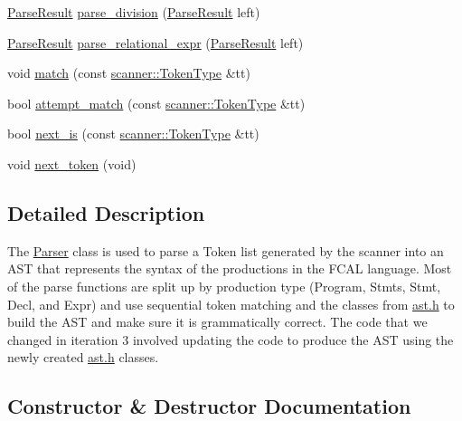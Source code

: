 \begin{DoxyCompactItemize}
\item 
\hyperlink{classfcal_1_1parser_1_1ParseResult}{Parse\+Result} \hyperlink{classfcal_1_1parser_1_1Parser_a244da88d6e0fffb16df81a2d63599d12}{parse\+\_\+division} (\hyperlink{classfcal_1_1parser_1_1ParseResult}{Parse\+Result} left)
\item 
\hyperlink{classfcal_1_1parser_1_1ParseResult}{Parse\+Result} \hyperlink{classfcal_1_1parser_1_1Parser_a6de383f3ce806fdeb0a627b323cadc82}{parse\+\_\+relational\+\_\+expr} (\hyperlink{classfcal_1_1parser_1_1ParseResult}{Parse\+Result} left)
\item 
void \hyperlink{classfcal_1_1parser_1_1Parser_a83087c1451996a4446a945e230a5a34c}{match} (const \hyperlink{namespacefcal_1_1scanner_ad95bd8241e3350b2d765f6b929eb0d93}{scanner\+::\+Token\+Type} \&tt)
\item 
bool \hyperlink{classfcal_1_1parser_1_1Parser_a995d89e662161c0e968da921ffc38153}{attempt\+\_\+match} (const \hyperlink{namespacefcal_1_1scanner_ad95bd8241e3350b2d765f6b929eb0d93}{scanner\+::\+Token\+Type} \&tt)
\item 
bool \hyperlink{classfcal_1_1parser_1_1Parser_a98962efd8ee05a0a39c7500a365f00f4}{next\+\_\+is} (const \hyperlink{namespacefcal_1_1scanner_ad95bd8241e3350b2d765f6b929eb0d93}{scanner\+::\+Token\+Type} \&tt)
\item 
void \hyperlink{classfcal_1_1parser_1_1Parser_a4d5068c9590fc1a6e370fc86a0057899}{next\+\_\+token} (void)
\end{DoxyCompactItemize}


\subsection{Detailed Description}
The \hyperlink{classfcal_1_1parser_1_1Parser}{Parser} class is used to parse a Token list generated by the scanner into an A\+ST that represents the syntax of the productions in the F\+C\+AL language. Most of the parse functions are split up by production type (Program, Stmts, Stmt, Decl, and Expr) and use sequential token matching and the classes from \hyperlink{ast_8h}{ast.\+h} to build the A\+ST and make sure it is grammatically correct. The code that we changed in iteration 3 involved updating the code to produce the A\+ST using the newly created \hyperlink{ast_8h}{ast.\+h} classes. 

\subsection{Constructor \& Destructor Documentation}
